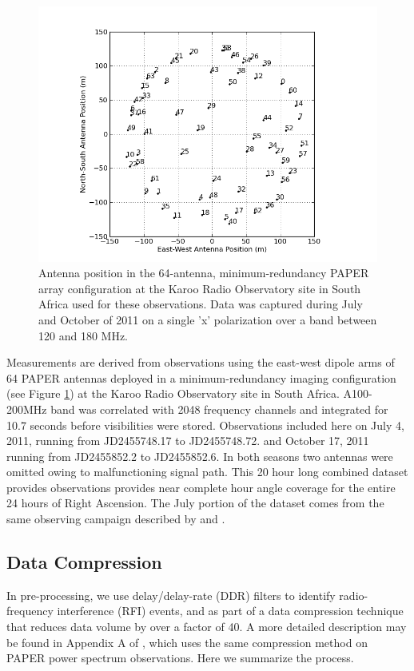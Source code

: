 \documentclass[preprint]{aastex}
\begin{document}
\begin{figure}\centering
\includegraphics[width=0.85\columnwidth]{plots/antpos.png}
\caption{Antenna position in the 64-antenna, minimum-redundancy PAPER array configuration at the Karoo Radio Observatory site in South Africa used for these observations.
Data was captured during July and October of 2011 on a single 'x' polarization over a band between 120 and 180 MHz.
}\label{fig:antpos}
\end{figure}

 Measurements are derived from observations using  the east-west dipole arms of
64 PAPER antennas deployed in a minimum-redundancy imaging configuration
(see Figure \ref{fig:antpos})
at the Karoo Radio Observatory site in South Africa.
A100-200MHz band was correlated
with 2048 frequency channels and integrated for 10.7 seconds before
visibilities were stored.  Observations included here on  July 4, 2011, running
from JD2455748.17 to JD2455748.72. and October 17, 2011 running from
JD2455852.2 to JD2455852.6.  In both seasons two antennas were omitted owing to
malfunctioning signal path. This 20 hour long combined dataset provides
observations provides near complete hour angle coverage for the entire 24 hours of
Right Ascension. The July portion of the dataset comes from the same observing
campaign described by \cite{Pober:2013p9567} and \cite{Stefan:2012p9707}. 

\subsection{Data Compression}

In pre-processing, we use delay/delay-rate (DDR) filters
\citep{Parsons:2009p7859} to identify radio-frequency interference (RFI)
events, and as part of a data compression technique that reduces data volume by
over a factor of 40.  A more detailed description may be found in Appendix A of
\cite{Parsons:2013p9876}, which uses the same compression method on PAPER power
spectrum observations. Here we summarize the process.
\end{document}
